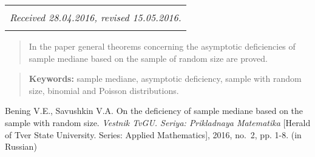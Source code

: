 \documentclass[a4paper,twoside]{article}
\theoremstyle{theorem}
\theoremstyle{remark}
\newcommand{\pages}{1-8}
\begin{document}
\begin{center}
\renewcommand{\arraystretch}{0}
\begin{tabular}{c}
\hline
\rule{0pt}{2mm}\\
\small\it
Received 28.04.2016,
revised 15.05.2016.
\\
\rule{0pt}{2mm}\\
\hline
\end{tabular}
\end{center}

\begin{quote}
In the paper general theorems concerning the asymptotic deficiencies of sample mediane based on the sample of random size are proved.
\end{quote}
\begin{quote}
{\bf Keywords:} sample mediane, asymptotic deficiency, sample with random size, binomial and Poisson distributions.
\end{quote}
\vspace{5mm}

\medskip
{Bening V.E., Savushkin V.A. On the deficiency of sample mediane based on the sample with random size. {\it Vestnik TvGU. Seriya: Prikladnaya Matematika} [Herald of Tver State University. Series: Applied Mathematics], 2016, no.~2, pp. \pages.} (in Russian) 
\end{document}
